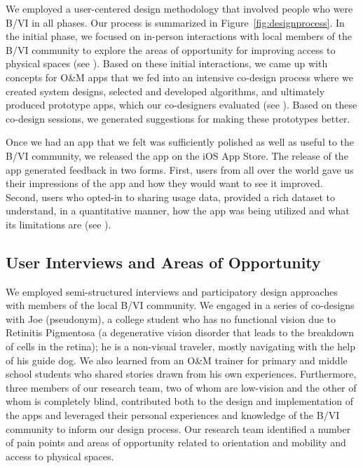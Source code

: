 \documentclass[chi_draft]{sigchi}
\newcommand{\BVI}{B/VI\xspace}
\newcommand{\OM}{O\&M\xspace}
\begin{document}
We employed a user-centered design methodology that involved people who were \BVI in all phases.  Our process is summarized in Figure~\ref{fig:designprocess}.  In the initial phase, we focused on in-person interactions with local members of the \BVI community to explore the areas of opportunity for improving access to physical spaces (see \emph{}).  Based on these initial interactions, we came up with concepts for \OM apps that we fed into an intensive co-design process where we created system designs, selected and developed algorithms, and ultimately produced prototype apps, which our co-designers evaluated (see \emph{}).  Based on these co-design sessions, we generated suggestions for making these prototypes better.

Once we had an app that we felt was sufficiently polished as well as useful to the \BVI community, we released the app on the iOS App Store.  The release of the app generated feedback in two forms.  First, users from all over the world gave us their impressions of the app and how they would want to see it improved.  Second, users who opted-in to sharing usage data, provided a rich dataset to understand, in a quantitative manner, how the app was being utilized and what its limitations are (see \emph{}).

\subsection{User Interviews and Areas of Opportunity}\label{sec:areasofopportunity}
We employed semi-structured interviews and participatory design approaches \cite{buhler2001empowered, schuler1993participatory} with members of the local \BVI community.  We engaged in a series of co-designs with  Joe (pseudonym), a college student who has no functional vision due to Retinitis Pigmentosa (a degenerative vision disorder that leads to the breakdown of cells in the retina); he is a non-visual traveler, mostly navigating with the help of his guide dog. We also learned from an \OM trainer for primary and middle school students who shared stories drawn from his own experiences. Furthermore, three members of our research team, two of whom are low-vision and the other of whom is completely blind, contributed both to the design and implementation of the apps and leveraged their personal experiences and knowledge of the \BVI community to inform our design process. Our research team identified a number of pain points and areas of opportunity related to orientation and mobility and access to physical spaces.
\end{document}
